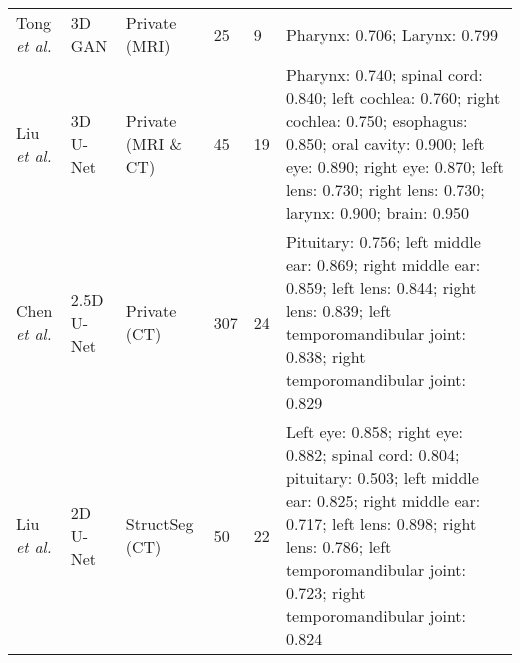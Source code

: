 \documentclass[lettersize,journal]{IEEEtran}
\begin{document}
{\begin{table*}[ht!]
{\begin{tabular}{@{}lllllm{}@{}}
Tong {\it{et al.}} \cite{41}        & 3D GAN                    & Private (MRI)             & 25                        & 9                           & Pharynx: 0.706; Larynx: 0.799                                                                                                                                                                                                                                                                                                                                                                                                                                                                                                             \\
Liu {\it{et al.}} \cite{43}         & 3D U-Net                  & Private (MRI \& CT)       & 45                        & 19                          & Pharynx: 0.740; spinal cord: 0.840; left cochlea: 0.760; right cochlea: 0.750; esophagus: 0.850; oral cavity: 0.900; left eye: 0.890; right eye: 0.870; left lens: 0.730; right lens: 0.730; larynx: 0.900; brain: 0.950                                                                                                                                                                                                                                                                                                                  \\
Chen {\it{et al.}} \cite{44}        & 2.5D U-Net                & Private (CT)              & 307                       & 24                          & Pituitary: 0.756; left middle ear: 0.869; right middle ear: 0.859; left lens: 0.844; right lens: 0.839; left temporomandibular joint: 0.838; right temporomandibular joint: 0.829                                                                                                                                                                                                                                                                                                                                                         \\
Liu {\it{et al.}} \cite{45}         & 2D U-Net                  & StructSeg (CT)            & 50                        & 22                          & Left eye: 0.858; right eye: 0.882; spinal cord: 0.804; pituitary: 0.503; left middle ear: 0.825; right middle ear: 0.717; left lens: 0.898; right lens: 0.786; left temporomandibular joint: 0.723; right temporomandibular joint: 0.824                                                                                                                                                                                                                                                                                                  \\

\end{tabular}}
\end{table*}}
\end{document}
